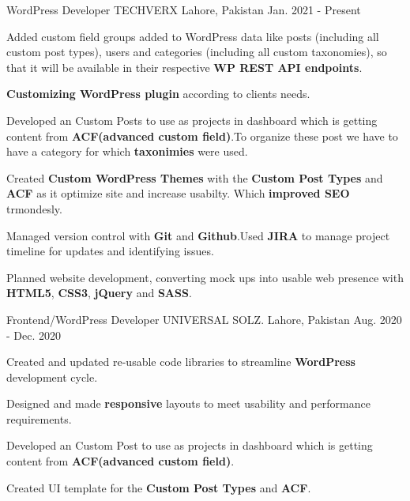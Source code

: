 

\begin{cventries}

  \cventry
    {WordPress Developer} %
    {TECHVERX} %
    {Lahore, Pakistan} %
    {Jan. 2021 - Present} %
    {
      \begin{cvitems} %
        \item {Added custom field groups added to WordPress data like posts (including all custom post types), users and categories (including all custom taxonomies), so that it will be available in their respective \textbf{WP REST API endpoints}.}
        \item {\textbf{Customizing WordPress plugin} according to clients needs.}
        \item {Developed an Custom Posts to use as projects in dashboard which is getting content from \textbf{ACF(advanced custom field)}.To organize these post we have to have a category for which \textbf{taxonimies} were used.}
        \item {Created \textbf{Custom WordPress Themes} with the \textbf{Custom Post Types} and \textbf{ACF} as it optimize site and increase usabilty. Which \textbf{improved SEO} trmondesly.}
        \item {Managed version control with \textbf{Git} and \textbf{Github}.Used \textbf{JIRA} to manage project timeline for updates and identifying issues.}
        \item {Planned website development, converting mock ups into usable web presence with \textbf{HTML5}, \textbf{CSS3}, \textbf{jQuery} and \textbf{SASS}.}
      \end{cvitems}
    }

  \cventry
    {Frontend/WordPress Developer} %
    {UNIVERSAL SOLZ.} %
    {Lahore, Pakistan} %
    {Aug. 2020 - Dec. 2020} %
    {
      \begin{cvitems} %
        \item {Created and updated re-usable code libraries to streamline \textbf{WordPress} development cycle.}
        \item {Designed and made \textbf{responsive} layouts to meet usability and performance requirements.}
        \item {Developed an Custom Post to use as projects in dashboard which is getting content from \textbf{ACF(advanced custom field)}.}
        \item {Created UI template for the \textbf{Custom Post Types} and \textbf{ACF}.}
      \end{cvitems}
    }


\end{cventries}
